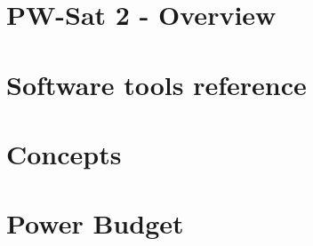 \documentclass{book}
\begin{document}
\maketitle

\setcounter{tocdepth}{1}
\tableofcontents

\chapter{PW-Sat 2 - Overview}





\chapter{Software tools reference}
% 
% 
% 
% 
% 

\chapter{\obc Concepts}















\chapter{Power Budget}

\end{document}
